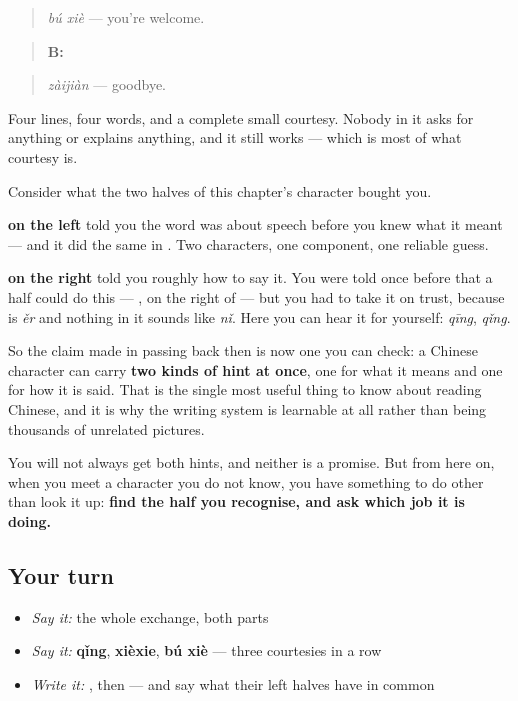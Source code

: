 \begin{quote}
\emph{bú xiè} — you're welcome.
\end{quote}

\begin{quote}
\textbf{B:} 
\end{quote}

\begin{quote}
\emph{zàijiàn} — goodbye.
\end{quote}

Four lines, four words, and a complete small courtesy. Nobody in it asks for anything or explains anything, and it still works — which is most of what courtesy is.

\begin{grammarlens}[title={What you've built — a component that predicts}]
Consider what the two halves of this chapter's character bought you.

\textbf{ on the left} told you the word was about speech before you knew what it meant — and it did the same in . Two characters, one component, one reliable guess.

\textbf{ on the right} told you roughly how to say it. You were told once before that a half could do this — , on the right of  — but you had to take it on trust, because  is \emph{ěr} and nothing in it sounds like \emph{nǐ}. Here you can hear it for yourself: \emph{qīng}, \emph{qǐng}.

So the claim made in passing back then is now one you can check: a Chinese character can carry \textbf{two kinds of hint at once}, one for what it means and one for how it is said. That is the single most useful thing to know about reading Chinese, and it is why the writing system is learnable at all rather than being thousands of unrelated pictures.

You will not always get both hints, and neither is a promise. But from here on, when you meet a character you do not know, you have something to do other than look it up: \textbf{find the half you recognise, and ask which job it is doing.}
\end{grammarlens}

\subsection*{Your turn}
\begin{itemize}
\raggedright
  \item \emph{Say it:} the whole exchange, both parts
  \item \emph{Say it:} \textbf{qǐng}, \textbf{xièxie}, \textbf{bú xiè} — three courtesies in a row
  \item \emph{Write it:} , then  — and say what their left halves have in common
\end{itemize}

